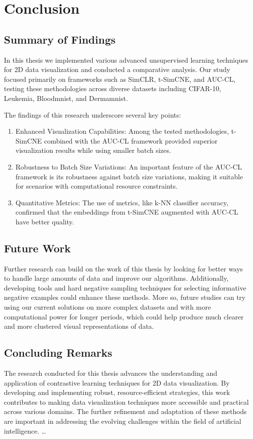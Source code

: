 \chapter{Conclusion}
\label{chap:conclusion}
\section{Summary of Findings}

In  this thesis we implemented various advanced unsupervised learning techniques for 2D data visualization and conducted a comparative analysis. Our study focused primarily on frameworks such as SimCLR, t-SimCNE, and AUC-CL, testing these methodologies across diverse datasets including CIFAR-10, Leukemia, Bloodmnist, and Dermamnist.

The findings of this research underscore several key points:
\begin{enumerate}
    \item {Enhanced Visualization Capabilities:} Among the tested methodologies, t-SimCNE combined with the AUC-CL framework provided superior visualization results while using smaller batch sizes. 
    \item {Robustness to Batch Size Variations:} An important feature of the AUC-CL framework is its robustness against batch size variations, making it suitable for scenarios with computational resource constraints.
    \item {Quantitative Metrics:}  The use of metrics, like k-NN classifier accuracy, confirmed that the embeddings from t-SimCNE augmented with AUC-CL have better quality.
    
\end{enumerate}

\section{Future Work}

Further research can build on the work of this thesis by looking for better ways to handle large amounts of data and improve our algorithms. Additionally, developing tools and hard negative sampling techniques for selecting informative negative examples could enhance these methods. More so, future studies can try using our current solutions on more complex datasets and with more computational power for longer periods, which could help produce much clearer and more clustered visual representations of data. 

\section{Concluding Remarks}

The research conducted for this thesis advances the understanding and application of contrastive learning techniques for 2D data visualization. By developing and implementing robust, resource-efficient strategies, this work contributes to making data visualization techniques more accessible and practical across various domains. The further refinement and adaptation of these methods are important in addressing the evolving challenges within the field of artificial intelligence.
\ldots